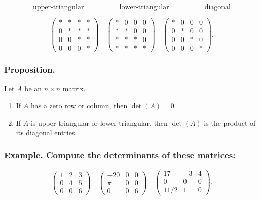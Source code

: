\documentclass[a4paper,12pt]{article}
\begin{document}
\[
\text{upper-triangular} \quad \quad \quad \quad \quad \text{lower-triangular} \quad \quad \quad \quad \quad \text{diagonal}
\]

\[
\begin{pmatrix}
* & * & * & * \\
0 & * & * & * \\
0 & 0 & * & * \\
0 & 0 & 0 & *
\end{pmatrix}
\quad
\begin{pmatrix}
* & 0 & 0 & 0 \\
* & * & 0 & 0 \\
* & * & * & 0 \\
* & * & * & *
\end{pmatrix}
\quad
\begin{pmatrix}
* & 0 & 0 & 0 \\
0 & * & 0 & 0 \\
0 & 0 & * & 0 \\
0 & 0 & 0 & *
\end{pmatrix}.
\]

\subsubsection*{Proposition.} Let \(A\) be an \(n \times n\) matrix.
\begin{enumerate}
    \item If \(A\) has a zero row or column, then \(\det(A) = 0\).
    \item If \(A\) is upper-triangular or lower-triangular, then \(\det(A)\) is the product of its diagonal entries.
\end{enumerate}

\subsubsection*{Example. Compute the determinants of these matrices:}

\[
\begin{pmatrix}
1 & 2 & 3 \\
0 & 4 & 5 \\
0 & 0 & 6
\end{pmatrix}
\quad
\begin{pmatrix}
-20 & 0 & 0 \\
\pi & 0 & 0 \\
0 & 0 & 6
\end{pmatrix}
\quad
\begin{pmatrix}
17 & -3 & 4 \\
0 & 0 & 0 \\
11/2 & 1 & 0
\end{pmatrix}.
\]
\end{document}
